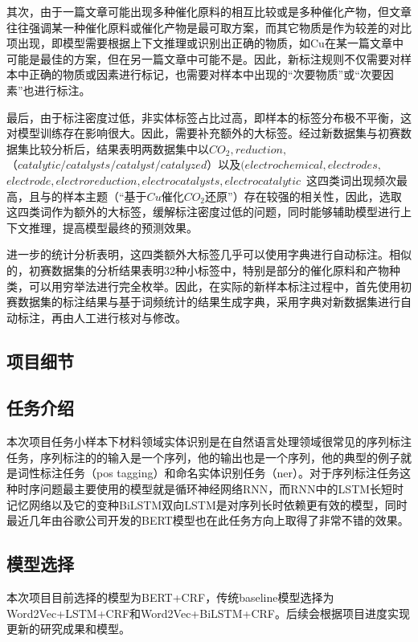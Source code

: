 \documentclass{article}
\begin{document}
其次，由于一篇文章可能出现多种催化原料的相互比较或是多种催化产物，但文章往往强调某一种催化原料或催化产物是最可取方案，而其它物质是作为较差的对比项出现，即模型需要根据上下文推理或识别出正确的物质，如Cu在某一篇文章中可能是最佳的方案，但在另一篇文章中可能不是。因此，新标注规则不仅需要对样本中正确的物质或因素进行标记，也需要对样本中出现的“次要物质”或“次要因素”也进行标注。

最后，由于标注密度过低，非实体标签占比过高，即样本的标签分布极不平衡，这对模型训练存在影响很大。因此，需要补充额外的大标签。经过新数据集与初赛数据集比较分析后，结果表明两数据集中以$CO_2 ,reduction ,$ $（catalytic/catalysts/catalyst/catalyzed）$以及$(electrochemical, electrodes,$ $electrode, electroreduction, electrocatalysts, electrocatalytic$ 这四类词出现频次最高，且与的样本主题（“基于$Cu$催化$CO_2$​还原”）存在较强的相关性，因此，选取这四类词作为额外的大标签，缓解标注密度过低的问题，同时能够辅助模型进行上下文推理，提高模型最终的预测效果。

进一步的统计分析表明，这四类额外大标签几乎可以使用字典进行自动标注。相似的，初赛数据集的分析结果表明32种小标签中，特别是部分的催化原料和产物种类，可以用穷举法进行完全枚举。因此，在实际的新样本标注过程中，首先使用初赛数据集的标注结果与基于词频统计的结果生成字典，采用字典对新数据集进行自动标注，再由人工进行核对与修改。

\newpage
\begin{center}
	\section{项目细节}
\end{center}

\subsection{任务介绍}
本次项目任务小样本下材料领域实体识别是在自然语言处理领域很常见的序列标注任务，序列标注的的输入是一个序列，他的输出也是一个序列，他的典型的例子就是词性标注任务（pos tagging）和命名实体识别任务（ner）。对于序列标注任务这种时序问题最主要使用的模型就是循环神经网络RNN，而RNN中的LSTM长短时记忆网络以及它的变种BiLSTM双向LSTM是对序列长时依赖更有效的模型，同时最近几年由谷歌公司开发的BERT模型也在此任务方向上取得了非常不错的效果。
\subsection{模型选择}
本次项目目前选择的模型为BERT+CRF，传统baseline模型选择为Word2Vec+LSTM+CRF和Word2Vec+BiLSTM+CRF。后续会根据项目进度实现更新的研究成果和模型。
\end{document}
